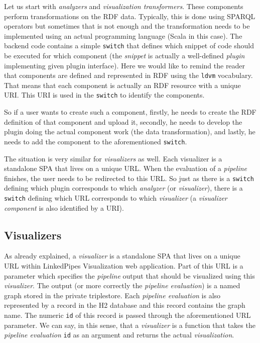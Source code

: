 Let us start with \emph{analyzers} and \emph{visualization transformers}. These components perform transformations on the RDF data. Typically, this is done using SPARQL operators but sometimes that is not enough and the transformation needs to be implemented using an actual programming language (Scala in this case). The backend code contains a simple \texttt{switch} that defines which snippet of code should be executed for which component (the \emph{snippet} is actually a well-defined \emph{plugin} implementing given plugin interface). Here we would like to remind the reader that components are defined and represented in RDF using the \texttt{ldvm} vocabulary. That means that each component is actually an RDF resource with a unique URI. This URI is used in the \texttt{switch} to identify the components. 

So if a user wants to create such a component, firstly, he needs to create the RDF definition of that component and upload it, secondly, he needs to develop the plugin doing the actual component work (the data transformation), and lastly, he needs to add the component to the aforementioned \texttt{switch}. 

The situation is very similar for \emph{visualizers} as well. Each visualizer is a standalone SPA that lives on a unique URL. When the evaluation of a \emph{pipeline} finishes, the user needs to be redirected to this URL. So just as there is a \texttt{switch} defining which plugin corresponds to which \emph{analyzer} (or \emph{visualizer}), there is a \texttt{switch} defining which URL corresponds to which \emph{visualizer} (a \emph{visualizer component} is also identified by a URI).

\subsection{Visualizers}
\label{sec:linkedpipes:visualizers}

As already explained, a \emph{visualizer} is a standalone SPA that lives on a unique URL within LinkedPipes Visualization web application. Part of this URL is a parameter which specifies the \emph{pipeline} output that should be visualized using this \emph{visualizer}. The output (or more correctly the \emph{pipeline evaluation}) is a named graph stored in the private triplestore. Each \emph{pipeline evaluation} is also represented by a record in the H2 database and this record contains the graph name. The numeric \texttt{id} of this record is passed through the aforementioned URL parameter. We can say, in this sense, that a \emph{visualizer} is a function that takes the \emph{pipeline evaluation} \texttt{id} as an argument and returns the actual \emph{visualization}.

